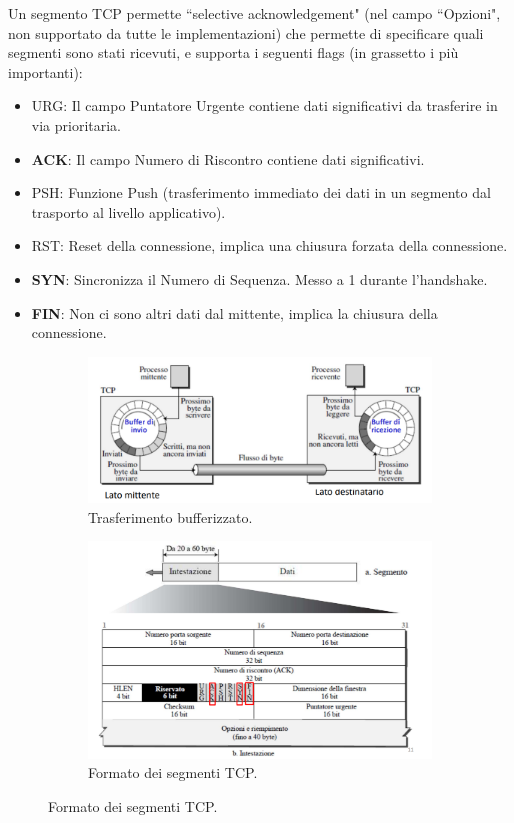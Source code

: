 \documentclass[11pt, italian, openany]{book}
\begin{document}
\begin{sloppypar}
\begin{itemize}[topsep=0pt]
	Un segmento TCP permette ``selective acknowledgement" (nel campo ``Opzioni", non supportato da tutte le implementazioni) che permette di
	specificare quali segmenti sono stati ricevuti, e supporta i seguenti flags (in grassetto i pi\`u importanti):
	\vspace{-3.5mm}
	\begin{itemize}
		\itemsep-0.3em
		\item URG: Il campo Puntatore Urgente contiene dati significativi da trasferire in via prioritaria.
		\item \textbf{ACK}: Il campo Numero di Riscontro contiene dati significativi.
		\item PSH: Funzione Push (trasferimento immediato dei dati in un segmento dal trasporto al livello applicativo).
		\item RST: Reset della connessione, implica una chiusura forzata della connessione.
		\item \textbf{SYN}: Sincronizza il Numero di Sequenza. Messo a 1 durante l'handshake.
		\item \textbf{FIN}: Non ci sono altri dati dal mittente, implica la chiusura della connessione.
	\end{itemize}
\pagebreak
	\begin{figure}[h!]
		\begin{subfigure}{0.49 \linewidth} \centering
			\includegraphics[scale=0.25]{images/tcp-trasferimento-bufferizzato.png}
			\caption{Trasferimento bufferizzato.}
		\end{subfigure}
		\begin{subfigure}{0.49 \linewidth} \centering
			\includegraphics[scale=0.25]{images/tcp-formato-segmenti.png}
			\caption{Formato dei segmenti TCP.}
		\end{subfigure}
	\end{figure}


\end{itemize}
\end{sloppypar}
\end{document}
